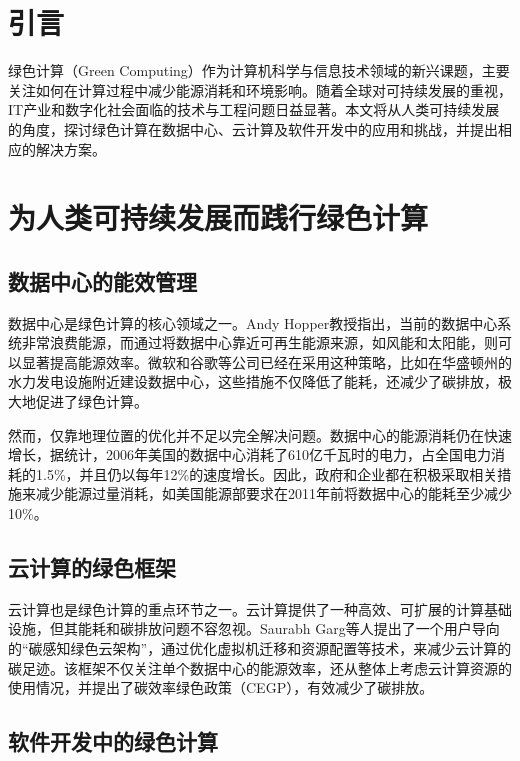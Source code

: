 \chapter{引言}

绿色计算（Green Computing）作为计算机科学与信息技术领域的新兴课题，主要关注如何在计算过程中减少能源消耗和环境影响。随着全球对可持续发展的重视，IT产业和数字化社会面临的技术与工程问题日益显著。本文将从人类可持续发展的角度，探讨绿色计算在数据中心、云计算及软件开发中的应用和挑战，并提出相应的解决方案。

\chapter{为人类可持续发展而践行绿色计算}

\section{数据中心的能效管理}

数据中心是绿色计算的核心领域之一。Andy Hopper教授指出，当前的数据中心系统非常浪费能源，而通过将数据中心靠近可再生能源来源，如风能和太阳能，则可以显著提高能源效率​​。微软和谷歌等公司已经在采用这种策略，比如在华盛顿州的水力发电设施附近建设数据中心​​，这些措施不仅降低了能耗，还减少了碳排放，极大地促进了绿色计算\cite{kurp2008green}。

然而，仅靠地理位置的优化并不足以完全解决问题。数据中心的能源消耗仍在快速增长，据统计，2006年美国的数据中心消耗了610亿千瓦时的电力，占全国电力消耗的1.5\%，并且仍以每年12\%的速度增长​​。因此，政府和企业都在积极采取相关措施来减少能源过量消耗，如美国能源部要求在2011年前将数据中心的能耗至少减少10\%​​。\cite{kurp2008green}

\section{云计算的绿色框架}

云计算也是绿色计算的重点环节之一。云计算提供了一种高效、可扩展的计算基础设施，但其能耗和碳排放问题不容忽视。Saurabh Garg等人提出了一个用户导向的“碳感知绿色云架构”，通过优化虚拟机迁移和资源配置等技术，来减少云计算的碳足迹​​。该框架不仅关注单个数据中心的能源效率，还从整体上考虑云计算资源的使用情况，并提出了碳效率绿色政策（CEGP），有效减少了碳排放​​。\cite{garg2011green}

\section{软件开发中的绿色计算}

